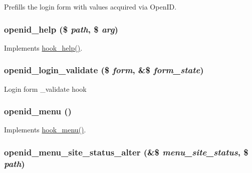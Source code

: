 Prefills the login form with values acquired via OpenID. \hypertarget{openid_8module_ab1f39ca3181eb680cf6ed2600f879299}{
\subsubsection[{openid\_\-help}]{\setlength{\rightskip}{0pt plus 5cm}openid\_\-help (\$ {\em path}, \/  \$ {\em arg})}}
\label{openid_8module_ab1f39ca3181eb680cf6ed2600f879299}
Implements \hyperlink{group__hooks_ga5589c2714a782738e8851c4c90231f0e}{hook\_\-help()}. \hypertarget{openid_8module_aae1394cded5f4c7167dc90307929472c}{
\subsubsection[{openid\_\-login\_\-validate}]{\setlength{\rightskip}{0pt plus 5cm}openid\_\-login\_\-validate (\$ {\em form}, \/  \&\$ {\em form\_\-state})}}
\label{openid_8module_aae1394cded5f4c7167dc90307929472c}
Login form \_\-validate hook \hypertarget{openid_8module_aa69d0d365b41e46075ea773c996138d7}{
\subsubsection[{openid\_\-menu}]{\setlength{\rightskip}{0pt plus 5cm}openid\_\-menu ()}}
\label{openid_8module_aa69d0d365b41e46075ea773c996138d7}
Implements \hyperlink{group__hooks_ga5c95244fea59b25666e409759e133ded}{hook\_\-menu()}. \hypertarget{openid_8module_aff513e1dfb782931acb6ba216acf47d6}{
\subsubsection[{openid\_\-menu\_\-site\_\-status\_\-alter}]{\setlength{\rightskip}{0pt plus 5cm}openid\_\-menu\_\-site\_\-status\_\-alter (\&\$ {\em menu\_\-site\_\-status}, \/  \$ {\em path})}}
